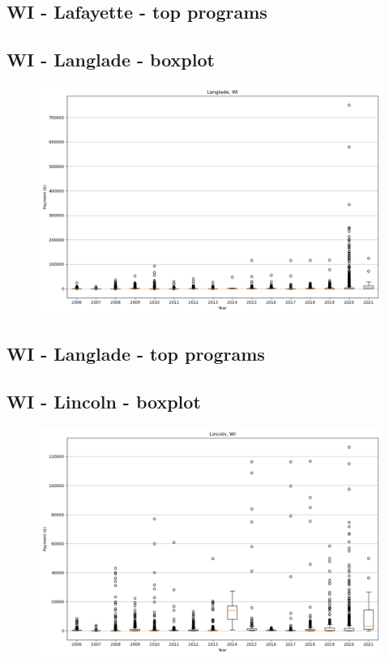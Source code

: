 \subsection*{WI - Lafayette - top programs}

\newpage
\subsection*{WI - Langlade - boxplot}
\begin{figure}[h]
\centering
\includegraphics[width=7in]{../output/boxplots/counties/Langlade-WI_boxplot.png}
\end{figure}


\subsection*{WI - Langlade - top programs}

\newpage
\subsection*{WI - Lincoln - boxplot}
\begin{figure}[h]
\centering
\includegraphics[width=7in]{../output/boxplots/counties/Lincoln-WI_boxplot.png}
\end{figure}


